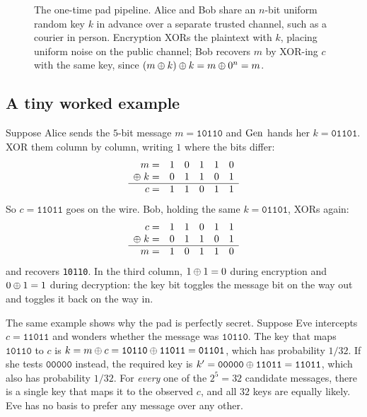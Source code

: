 \begin{figure}[htbp]
\caption{The one-time pad pipeline. Alice and Bob share an $n$-bit uniform random key $k$ in advance over a separate trusted channel, such as a courier in person. Encryption XORs the plaintext with $k$, placing uniform noise on the public channel; Bob recovers $m$ by XOR-ing $c$ with the same key, since $(m \oplus k) \oplus k = m \oplus 0^n = m$.}
\label{ch09:fig-otp-flow}
\end{figure}

\subsection{A tiny worked example}
\label{ch09:tiny}

Suppose Alice sends the $5$-bit message $m = \texttt{10110}$ and $\operatorname{Gen}$ hands her $k = \texttt{01101}$. XOR them column by column, writing $1$ where the bits differ:
\[
\begin{array}{rccccc}
 m = & 1 & 0 & 1 & 1 & 0 \\
 \oplus\; k = & 0 & 1 & 1 & 0 & 1 \\ \hline
 c = & 1 & 1 & 0 & 1 & 1
\end{array}
\]
So $c = \texttt{11011}$ goes on the wire. Bob, holding the same $k = \texttt{01101}$, XORs again:
\[
\begin{array}{rccccc}
 c = & 1 & 1 & 0 & 1 & 1 \\
 \oplus\; k = & 0 & 1 & 1 & 0 & 1 \\ \hline
 m = & 1 & 0 & 1 & 1 & 0
\end{array}
\]
and recovers \texttt{10110}. In the third column, $1 \oplus 1 = 0$ during encryption and $0 \oplus 1 = 1$ during decryption: the key bit toggles the message bit on the way out and toggles it back on the way in.

The same example shows why the pad is perfectly secret. Suppose Eve intercepts $c = \texttt{11011}$ and wonders whether the message was $\texttt{10110}$. The key that maps $\texttt{10110}$ to $c$ is $k = m \oplus c = \texttt{10110} \oplus \texttt{11011} = \texttt{01101}$, which has probability $1/32$. If she tests $\texttt{00000}$ instead, the required key is $k' = \texttt{00000} \oplus \texttt{11011} = \texttt{11011}$, which also has probability $1/32$. For \emph{every} one of the $2^5 = 32$ candidate messages, there is a single key that maps it to the observed $c$, and all $32$ keys are equally likely. Eve has no basis to prefer any message over any other.

